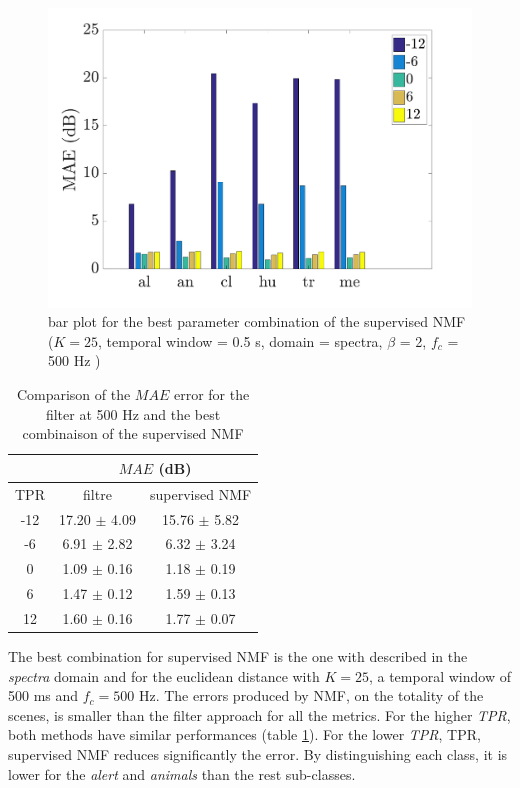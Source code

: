 \documentclass[twocolumn,a4paper,10pt]{article}
\begin{document}
\begin{figure}[h]
\centering
\includegraphics[width=\linewidth]{../image/AmbianceNmfSupervised.pdf}
\caption{bar plot for the best parameter combination of the supervised NMF ($K = 25$, temporal window = 0.5 s, domain = spectra, $\beta$ = 2, $f_c$ = 500 Hz )}
\label{fig:nmfSupervisedAmbiance}
\end{figure}

\begin{table}[h]
\centering
\begin{tabular}{ccc}
    & \multicolumn{2}{c}{$MAE$ (dB)} \\ \hline
TPR & filtre & supervised NMF \\ \hline
 -12 & 17.20 $\pm$ 4.09 & 15.76 $\pm$ 5.82 \\ 
 -6 &  6.91 $\pm$ 2.82 & 6.32 $\pm$ 3.24\\ 
 0 & 1.09 $\pm$ 0.16 & 1.18 $\pm$ 0.19\\
  6 &  1.47 $\pm$ 0.12 & 1.59 $\pm$ 0.13\\ 
 12 &  1.60 $\pm$ 0.16 & 1.77 $\pm$ 0.07
\end{tabular}
\caption{Comparison of the $MAE$ error for the filter at 500 Hz and the best combinaison of the supervised NMF}
\label{tab:resultsComparison}
\end{table}


The best combination for supervised NMF is the one with described in the \textit{spectra} domain and for the euclidean distance with $K = 25$, a temporal window of 500 ms and $f_c = 500$ Hz. The errors produced by NMF, on the totality of the scenes, is smaller than the filter approach for all the metrics. For the higher \textit{TPR}, both methods have similar performances (table \ref{tab:resultsComparison}). For the lower \textit{TPR}, TPR, supervised NMF reduces significantly the error. By distinguishing each class, it is lower for the \textit{alert} and \textit{animals} than the rest sub-classes. \\
\end{document}
